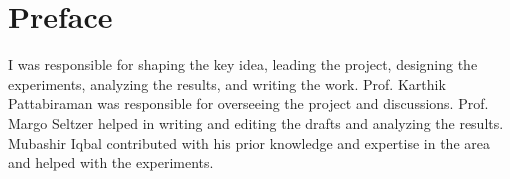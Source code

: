 
\chapter{Preface}

I was responsible for shaping the key idea, leading the project, designing the experiments, analyzing the results, and writing the work.
Prof. Karthik Pattabiraman was responsible for overseeing the project and discussions.
Prof. Margo Seltzer helped in writing and editing the drafts and analyzing the results. 
Mubashir Iqbal contributed with his prior knowledge and expertise in the area and helped with the experiments.
